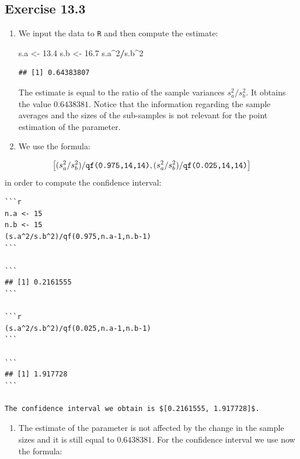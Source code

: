 \documentclass[]{krantz}
\makeatletter
\newenvironment{Shaded}{\begin{snugshade}}{\end{snugshade}}
\newcommand{\DecValTok}[1]{\textcolor[rgb]{0.00,0.00,0.81}{#1}}
\newcommand{\FloatTok}[1]{\textcolor[rgb]{0.00,0.00,0.81}{#1}}
\newcommand{\NormalTok}[1]{#1}
\newcommand{\OperatorTok}[1]{\textcolor[rgb]{0.81,0.36,0.00}{\textbf{#1}}}
\newcommand{\StringTok}[1]{\textcolor[rgb]{0.31,0.60,0.02}{#1}}
\providecommand{\tightlist}{%
  \setlength{\itemsep}{0pt}\setlength{\parskip}{0pt}}
\newenvironment{kframe}{%
\medskip{}
\setlength{\fboxsep}{.8em}
 \def\at@end@of@kframe{}%
 \ifinner\ifhmode%
  \def\at@end@of@kframe{\end{minipage}}%
  \begin{minipage}{\columnwidth}%
 \fi\fi%
 \def\FrameCommand##1{\hskip\@totalleftmargin \hskip-\fboxsep
 \colorbox{shadecolor}{##1}\hskip-\fboxsep
     \hskip-\linewidth \hskip-\@totalleftmargin \hskip\columnwidth}%
 \MakeFramed {\advance\hsize-\width
   \@totalleftmargin\z@ \linewidth\hsize
   \@setminipage}}%
 {\par\unskip\endMakeFramed%
 \at@end@of@kframe}
\renewenvironment{Shaded}{\begin{kframe}}{\end{kframe}}
\theoremstyle{definition}
\theoremstyle{definition}
\theoremstyle{definition}
\theoremstyle{remark}
\makeatother
\begin{document}
\hypertarget{exercise-13.3}{%
\subsection*{Exercise 13.3}\label{exercise-13.3}}


\begin{enumerate}
\def\labelenumi{\arabic{enumi}.}
\item
  We input the data to \texttt{R} and then compute the estimate:

\begin{Shaded}
\begin{Highlighting}[]
\NormalTok{s.a <-}\StringTok{ }\FloatTok{13.4}
\NormalTok{s.b <-}\StringTok{ }\FloatTok{16.7}
\NormalTok{s.a}\OperatorTok{^}\DecValTok{2}\OperatorTok{/}\NormalTok{s.b}\OperatorTok{^}\DecValTok{2}
\end{Highlighting}
\end{Shaded}

\begin{verbatim}
## [1] 0.64383807
\end{verbatim}

  The estimate is equal to the ratio of the sample variances
  \(s_a^2/s_b^2\). It obtains the value \(0.6438381\). Notice that the
  information regarding the sample averages and the sizes of the
  sub-samples is not relevant for the point estimation of the parameter.
\item
  We use the formula:
\end{enumerate}

\[\big[(s_a^2/s_b^2)/\mbox{\texttt{qf(0.975,14,14)}} , (s_a^2/s_b^2)/\mbox{\texttt{qf(0.025,14,14)}}\big]\]
in order to compute the confidence interval:

\begin{verbatim}
```r
n.a <- 15
n.b <- 15
(s.a^2/s.b^2)/qf(0.975,n.a-1,n.b-1)
```

```
## [1] 0.2161555
```

```r
(s.a^2/s.b^2)/qf(0.025,n.a-1,n.b-1)
```

```
## [1] 1.917728
```

The confidence interval we obtain is $[0.2161555, 1.917728]$.
\end{verbatim}

\begin{enumerate}
\def\labelenumi{\arabic{enumi}.}
\setcounter{enumi}{2}
\tightlist
\item
  The estimate of the parameter is not
  affected by the change in the sample sizes and it is still equal to
  \(0.6438381\). For the confidence interval we use now the formula:
\end{enumerate}
\end{document}
